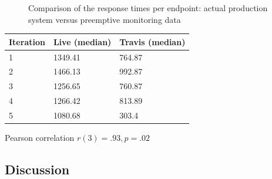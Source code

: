 \documentclass{sig-alternate-05-2015}
\begin{document}

\begin{figure}
	\centering
	\quad
	\caption{Comparison of the response times per endpoint: actual production system versus preemptive monitoring data}
	\label{fig:preemptive}
\end{figure}


\begin{table}[h]
	\begin{tabular}{lll}
		\toprule
		Iteration & \bfseries Live (median) & \bfseries Travis (median)\\
		\midrule
		1 & 1349.41 & 764.87\\ 
		2 & 1466.13 & 992.87\\
		3 & 1256.65 & 760.87\\
		4 & 1266.42 & 813.89\\
		5 & 1080.68 & 303.4\\
		\bottomrule
	\end{tabular}
\end{table}

Pearson correlation $r(3)=.93, p=.02$

\subsection{Discussion}
\end{document}
